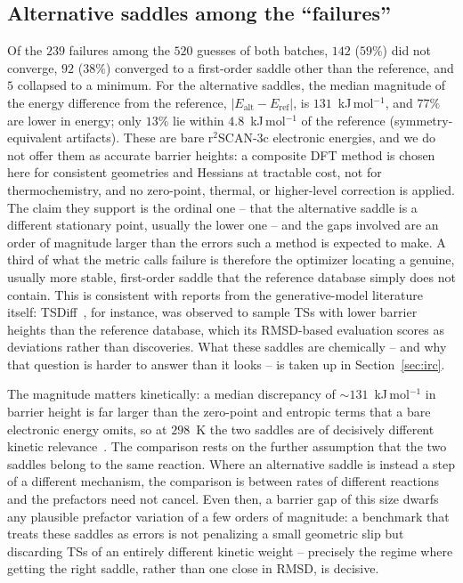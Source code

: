 \documentclass[11pt]{article}
\begin{document}
\subsection{Alternative saddles among the ``failures''}
\label{sec:alt}
Of the $239$ failures among the $520$ guesses of both batches, $142$ ($59\%$) did
not converge, $92$ ($38\%$) converged to a first-order saddle other than the
reference, and $5$ collapsed to a minimum. For the
alternative saddles, the median magnitude of the energy difference from the
reference, $\lvert E_{\mathrm{alt}}-E_{\mathrm{ref}}\rvert$, is
$131$~kJ\,mol$^{-1}$, and $77\%$ are lower in energy; only $13\%$ lie within
$4.8$~kJ\,mol$^{-1}$ of the
reference (symmetry-equivalent artifacts). These are bare r$^2$SCAN-3c electronic
energies, and we do not offer them as accurate barrier heights: a composite DFT
method is chosen here for consistent geometries and Hessians at tractable cost,
not for thermochemistry, and no zero-point, thermal, or higher-level correction is
applied. The claim they support is the ordinal one -- that the alternative saddle
is a different stationary point, usually the lower one -- and the gaps involved are
an order of magnitude larger than the errors such a method is expected to make.
A third of what the metric calls
failure is therefore the optimizer locating a genuine, usually more stable,
first-order saddle that the reference database simply does not contain. This is
consistent with reports from the generative-model literature itself: TSDiff~\cite{TSDiff}, for
instance, was observed to sample TSs with lower barrier
heights than the reference database, which its RMSD-based evaluation
scores as deviations rather than discoveries. What these saddles are chemically --
and why that question is harder to answer than it looks -- is taken up in
Section~\ref{sec:irc}.

The magnitude matters kinetically: a median discrepancy of $\sim 131$~kJ\,mol$^{-1}$
in barrier height is far larger than the zero-point and entropic terms that a bare
electronic energy omits, so at $298$~K the two saddles are of decisively different
kinetic relevance~\cite{Eyring1935}. The comparison rests on the further assumption
that the two saddles belong to the
same reaction. Where an alternative saddle is instead a step
of a different mechanism, the comparison is between rates of different
reactions and the prefactors need not cancel. Even then, a barrier gap of this
size dwarfs any plausible prefactor variation of a few orders of magnitude: a
benchmark that treats these saddles as errors is not penalizing a small geometric
slip but discarding TSs of an entirely different kinetic weight -- precisely the
regime where getting the right saddle, rather than
one close in RMSD, is decisive.
\end{document}
